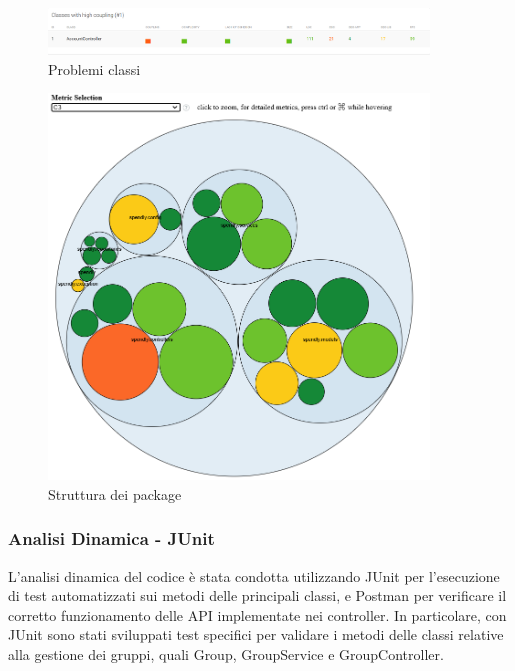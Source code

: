 \begin{figure}[H]
    \centering
    \includegraphics[width=0.9\textwidth]{images/Problem3_iter1.png}
    \caption{Problemi classi}
    \label{fig:Problemi_iterazione1}
\end{figure}



\begin{figure}[H]
    \centering
    \includegraphics[width=0.9\textwidth]{images/CodeMR_graph2.png}
    \caption{Struttura dei package}
    \label{fig:Package_iterazione1}
\end{figure}


\subsubsection{Analisi Dinamica - JUnit}

L'analisi dinamica del codice è stata condotta utilizzando JUnit per l'esecuzione di test automatizzati sui metodi delle principali classi, e Postman per verificare il corretto funzionamento delle API implementate nei controller.
In particolare, con JUnit sono stati sviluppati test specifici per validare i metodi delle classi relative alla gestione dei gruppi, quali Group, GroupService e GroupController.

